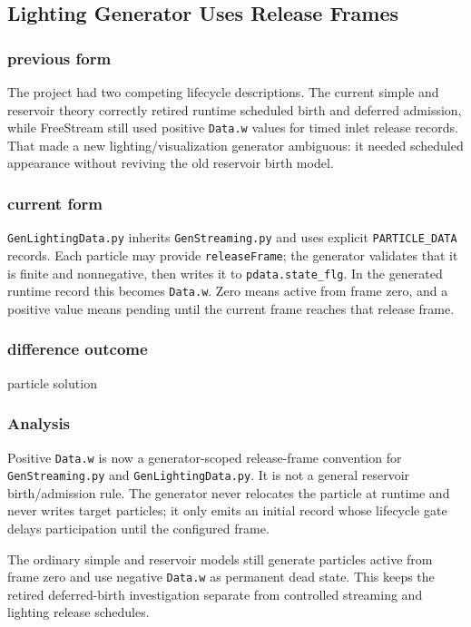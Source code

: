 \subsection{Lighting Generator Uses Release Frames}

\subsubsection{previous form}

The project had two competing lifecycle descriptions.  The current simple and
reservoir theory correctly retired runtime scheduled birth and deferred
admission, while FreeStream still used positive \texttt{Data.w} values for
timed inlet release records.  That made a new lighting/visualization
generator ambiguous: it needed scheduled appearance without reviving the old
reservoir birth model.

\subsubsection{current form}

\texttt{GenLightingData.py} inherits \texttt{GenStreaming.py} and uses
explicit \texttt{PARTICLE\_DATA} records.  Each particle may provide
\texttt{releaseFrame}; the generator validates that it is finite and
nonnegative, then writes it to \texttt{pdata.state\_flg}.  In the generated
runtime record this becomes \texttt{Data.w}.  Zero means active from frame
zero, and a positive value means pending until the current frame reaches that
release frame.

\subsubsection{difference outcome}

particle solution

\subsubsection{Analysis}

Positive \texttt{Data.w} is now a generator-scoped release-frame convention
for \texttt{GenStreaming.py} and \texttt{GenLightingData.py}.  It is not a
general reservoir birth/admission rule.  The generator never relocates the
particle at runtime and never writes target particles; it only emits an
initial record whose lifecycle gate delays participation until the configured
frame.

The ordinary simple and reservoir models still generate particles active from
frame zero and use negative \texttt{Data.w} as permanent dead state.  This
keeps the retired deferred-birth investigation separate from controlled
streaming and lighting release schedules.

